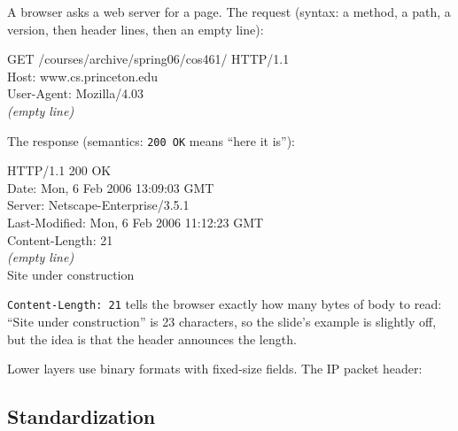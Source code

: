 \begin{example}
A browser asks a web server for a page. The request (syntax: a method, a path, a version, then header lines, then an empty line):
\begin{center}\begin{minipage}{0.8\linewidth}\ttfamily\footnotesize
GET /courses/archive/spring06/cos461/ HTTP/1.1\\
Host: www.cs.princeton.edu\\
User-Agent: Mozilla/4.03\\
\textit{(empty line)}
\end{minipage}\end{center}
The response (semantics: \texttt{200 OK} means ``here it is''):
\begin{center}\begin{minipage}{0.8\linewidth}\ttfamily\footnotesize
HTTP/1.1 200 OK\\
Date: Mon, 6 Feb 2006 13:09:03 GMT\\
Server: Netscape-Enterprise/3.5.1\\
Last-Modified: Mon, 6 Feb 2006 11:12:23 GMT\\
Content-Length: 21\\
\textit{(empty line)}\\
Site under construction
\end{minipage}\end{center}
\texttt{Content-Length: 21} tells the browser exactly how many bytes of body to read: ``Site under construction'' is 23 characters, so the slide's
example is slightly off, but the idea is that the header announces the length.
\end{example}

\begin{example}
Lower layers use binary formats with fixed-size fields. The IP packet header:
\end{example}

\subsection{Standardization}

